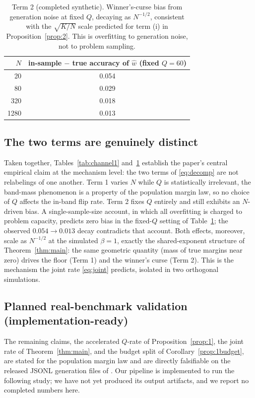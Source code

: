 \documentclass{article} %
\providecommand{\what}{\widehat{w}}
\begin{document}
\begin{table}[t]
\centering
\small
\begin{tabular}{rc}
\toprule
$N$ & in-sample $-$ true accuracy of $\what$ (fixed $Q=60$) \\
\midrule
20   & 0.054 \\
80   & 0.029 \\
320  & 0.018 \\
1280 & 0.013 \\
\bottomrule
\end{tabular}
\caption{Term 2 (completed synthetic). Winner's-curse bias from generation
noise at fixed $Q$, decaying as $N^{-1/2}$, consistent with the $\sqrt{K/N}$ scale
predicted for term (i) in Proposition~\ref{prop:2}. This is overfitting to
generation noise, not to problem sampling.}
\label{tab:channel2}
\end{table}

\subsection{The two terms are genuinely distinct}
\label{sec:exp-distinct}

Taken together, Tables~\ref{tab:channel1} and~\ref{tab:channel2} establish the
paper's central empirical claim at the mechanism level: the two terms of
\eqref{eq:decomp} are not relabelings of one another. Term 1 varies $N$ while
$Q$ is statistically irrelevant, the band-mass phenomenon is a property of the
population margin law, so no choice of $Q$ affects the in-band flip rate. Term
2 fixes $Q$ entirely and still exhibits an $N$-driven bias. A single-sample-size
account, in which all overfitting is charged to problem capacity, predicts zero
bias in the fixed-$Q$ setting of Table~\ref{tab:channel2}; the observed
$0.054 \to 0.013$ decay contradicts that account. Both effects, moreover, scale as
$N^{-1/2}$ at the simulated $\beta=1$, exactly the shared-exponent structure of
Theorem~\ref{thm:main}: the same geometric quantity (mass of true margins near
zero) drives the floor (Term 1) and the winner's curse (Term 2). This is
the mechanism the joint rate \eqref{eq:joint} predicts, isolated in two orthogonal
simulations.

\subsection{Planned real-benchmark validation (implementation-ready)}
\label{sec:exp-real}

The remaining claims, the accelerated $Q$-rate of Proposition~\ref{prop:1}, the
joint rate of Theorem~\ref{thm:main}, and the budget split of
Corollary~\ref{prop:1budget}, are stated for the population margin law and are
directly falsifiable on the released JSONL generation files of
\citet{komiyama2026best}. Our pipeline is implemented to run the following study;
we have not yet produced its output artifacts, and we report no completed numbers
here.
\end{document}
